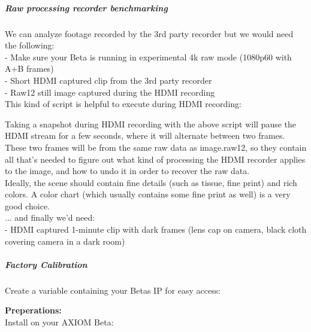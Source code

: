 



\subparagraph{Raw processing recorder benchmarking}
	
We can analyze footage recorded by the 3rd party recorder but we would need the following:\\
	
- Make sure your Beta is running in experimental 4k raw mode (1080p60 with A+B frames)\\
- Short HDMI captured clip from the 3rd party recorder\\
- Raw12 still image captured during the HDMI recording\\
	
This kind of script is helpful to execute during HDMI recording: 
	

Taking a snapshot during HDMI recording with the above script will pause the HDMI stream for a few seconds, where it will alternate between two frames. These two frames will be from the same raw data as image.raw12, so they contain all that's needed to figure out what kind of processing the HDMI recorder applies to the image, and how to undo it in order to recover the raw data.\\
	
Ideally, the scene should contain fine details (such as tissue, fine print) and rich colors. A color chart (which usually contains some fine print as well) is a very good choice. \\
	
... and finally we'd need:\\
	
- HDMI captured 1-minute clip with dark frames (lens cap on camera, black cloth covering camera in a dark room)
	
	
	
	
\subparagraph{Factory Calibration}
	
Create a variable containing your Betas IP for easy access:
	
\textbf{Preperations:}\\
	
Install on your AXIOM Beta: 
	
	
